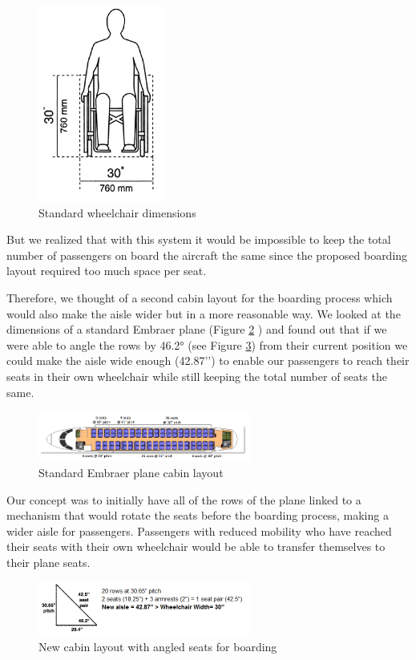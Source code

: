 \begin{figure}[h]
  \centering
     \includegraphics[scale=1]{images/wheelchair_dimensions.png}
   \caption{Standard wheelchair dimensions}
  \label{fig:wheelchair_dimensions}
\end{figure}

But we realized that with this system it would be impossible to keep the total number of passengers on board the aircraft the same since the proposed boarding layout required too much space per seat. 

Therefore, we thought of a second cabin layout for the boarding process which would also make the aisle wider but in a more reasonable way. We looked at the dimensions of a standard Embraer plane (Figure \ref{fig:embraer_plane} ) and found out that if we were able to angle the rows by 46.2° (see Figure \ref{fig:angled_seats}) from their current position we could make the aisle wide enough (42.87’’) to enable our passengers to reach their seats in their own wheelchair while still keeping the total number of seats the same.

\begin{figure}[h]
  \centering
     \includegraphics[width=7cm]{images/embraer_plane.png}
   \caption{Standard Embraer plane cabin layout}
  \label{fig:embraer_plane}
\end{figure}

Our concept was to initially have all of the rows of the plane linked to a mechanism that would rotate the seats before the boarding process, making a wider aisle for passengers. Passengers with reduced mobility who have reached their seats with their own wheelchair would be able to transfer themselves  to their plane seats. 
\begin{figure}[h]
  \centering
     \includegraphics[width=7cm]{images/angled_seats.png}
   \caption{New cabin layout with angled seats for boarding}
  \label{fig:angled_seats}
\end{figure}

